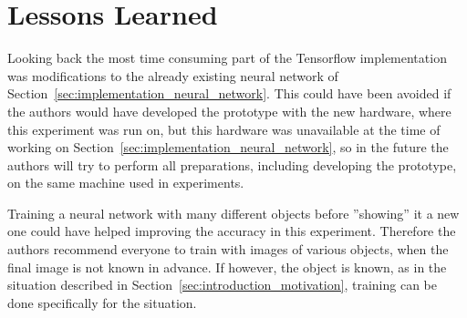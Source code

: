 \section{Lessons Learned}
Looking back the most time consuming part of the Tensorflow implementation was modifications to the already existing neural network of Section~\ref{sec:implementation_neural_network}. This could have been avoided if the authors would have developed the prototype with the new hardware, where this experiment was run on, but this hardware was unavailable at the time of working on Section~\ref{sec:implementation_neural_network}, so in the future the authors will try to perform all preparations, including developing the prototype, on the same machine used in experiments.

Training a neural network with many different objects before ''showing'' it a new one could have helped improving the accuracy in this experiment. Therefore the authors recommend everyone to train with images of various objects, when the final image is not known in advance. If however, the object is known, as in the situation described in Section~\ref{sec:introduction_motivation}, training can be done specifically for the situation.

\filbreak

